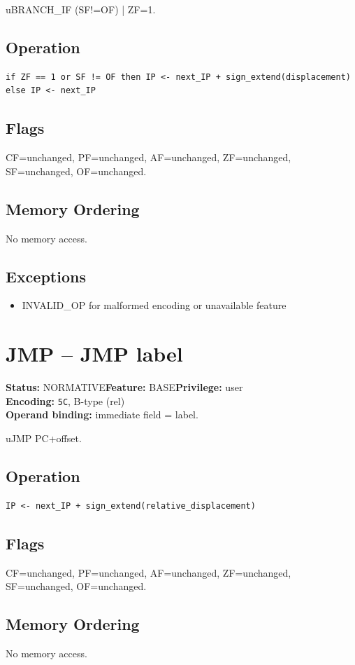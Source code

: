 \documentclass[10pt]{article}
\begin{document}
uBRANCH\_IF (SF!=OF) | ZF=1.

\subsection*{Operation}
\begin{lstlisting}
if ZF == 1 or SF != OF then IP <- next_IP + sign_extend(displacement) else IP <- next_IP
\end{lstlisting}
\subsection*{Flags}
CF=unchanged, PF=unchanged, AF=unchanged, ZF=unchanged, SF=unchanged, OF=unchanged.
\subsection*{Memory Ordering}
No memory access.
\subsection*{Exceptions}
\begin{itemize}
\item INVALID\_OP for malformed encoding or unavailable feature
\end{itemize}
\clearpage

\section{JMP -- JMP label}
\textbf{Status:} NORMATIVE\quad \textbf{Feature:} BASE\quad \textbf{Privilege:} user\\
\textbf{Encoding:} \texttt{5C}, B-type (rel)\\
\textbf{Operand binding:} immediate field = label.

uJMP PC+offset.

\subsection*{Operation}
\begin{lstlisting}
IP <- next_IP + sign_extend(relative_displacement)
\end{lstlisting}
\subsection*{Flags}
CF=unchanged, PF=unchanged, AF=unchanged, ZF=unchanged, SF=unchanged, OF=unchanged.
\subsection*{Memory Ordering}
No memory access.
\end{document}
